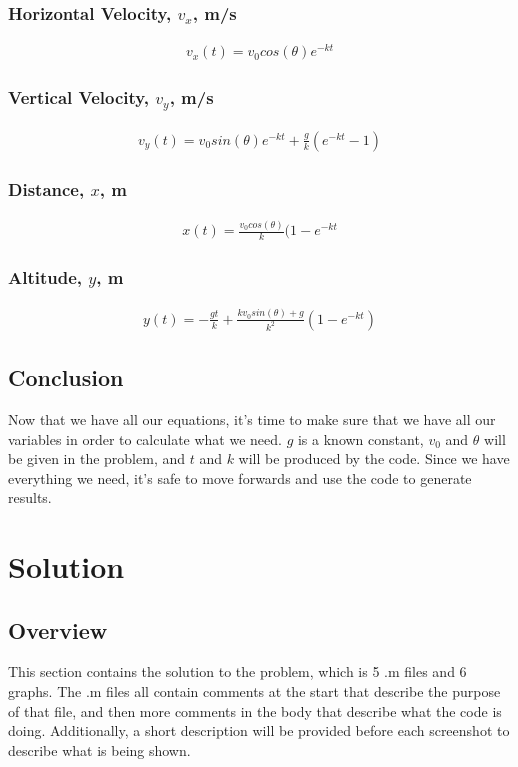 \documentclass[oneside]{article}
\begin{document}
\subsubsection{Horizontal Velocity, $v_x$, m/s}
    \begin{align}
        v_x(t) = v_0cos(\theta)e^{-kt}
    \end{align}
\subsubsection{Vertical Velocity, $v_y$, m/s}
    \begin{align}
        v_y(t) = v_0sin(\theta)e^{-kt} + \frac{g}{k}(e^{-kt} -1)
    \end{align}
\subsubsection{Distance, $x$, m}
    \begin{align}
        x(t) = \frac{v_0cos(\theta)}{k}(1-e^{-kt}
    \end{align}
\subsubsection{Altitude, $y$, m}
    \begin{align}
        y(t) = -\frac{gt}{k} + \frac{kv_0sin(\theta) + g}{k^2}(1-e^{-kt})
    \end{align}
\subsection{Conclusion}
Now that we have all our equations, it's time to make sure that we have all our variables in order to calculate what we need. $g$ is a known constant, $v_0$ and $\theta$ will be given in the problem, and $t$ and $k$ will be produced by the code. Since we have everything we need, it's safe to move forwards and use the code to generate results.\\

\clearpage

\section{Solution}
\subsection{Overview}
This section contains the solution to the problem, which is 5 .m files and 6 graphs. The .m files all contain comments at the start that describe the purpose of that file, and then more comments in the body that describe what the code is doing. Additionally, a short description will be provided before each screenshot to describe what is being shown.
\newpage
\end{document}
